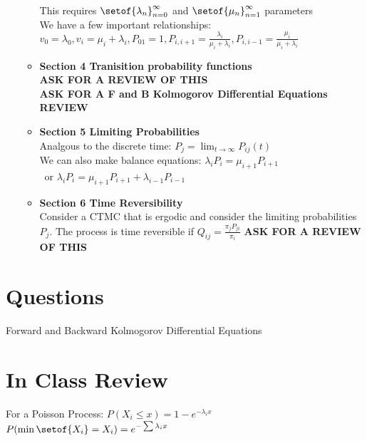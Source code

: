 \documentclass[answers,12pt,addpoints]{exam}
\begin{document}
\begin{itemize}
\begin{itemize}
        This requires $\setof{\lambda_n}_{n=0}^\infty$ and $\setof{\mu_n}_{n=1}^\infty$ parameters\\
        We have a few important relationships: \\
        $ v_0 = \lambda_0, v_i = \mu_i + \lambda_i, P_01 = 1, P_{i,i+1} = \frac{\lambda_i}{\mu_i + \lambda_i}, P_{i,i-1} = \frac{\mu_i}{\mu_i + \lambda_i}$\\
        \item \textbf{Section 4 Tranisition probability functions} \\
        \textbf{ASK FOR A REVIEW OF THIS}\\
        \textbf{ASK FOR A F and B Kolmogorov Differential Equations REVIEW}
        \item \textbf{Section 5 Limiting Probabilities} \\
        Analgous to the discrete time: $P_j = \lim_{t \to \infty} P_{ij}(t)$\\
        We can also make balance equations: $\lambda_i P_i = \mu_{i+1} P_{i+1}$\\\
        or $\lambda_i P_i = \mu_{i+1} P_{i+1} + \lambda_{i-1} P_{i-1}$\\
        \item \textbf{Section 6 Time Reversibility} \\
        Consider a CTMC that is ergodic and consider the limiting probabilities $P_j$. The process is time reversible if $Q_{ij} = \frac{\pi_j P_{ji}}{\pi_i}$ \textbf{ASK FOR A REVIEW OF THIS}
    \end{itemize}
\end{itemize}


\section*{Questions}
Forward and Backward Kolmogorov Differential Equations



\section*{In Class Review}
For a Poisson Process: $P(X_i \leq x) = 1 - e^{-\lambda_i x}$ \\
$P(\min\setof{X_i} = X_i) = e^{-\sum \lambda_i x}$\\
\end{document}
